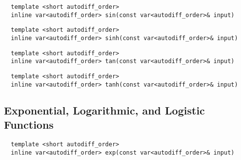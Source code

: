 \begin{tcolorbox}[colback=white,colframe=gray90, coltitle=black,boxrule=3pt,
fonttitle=\bfseries,title=Sine]

\begin{verbatim}
  template <short autodiff_order>
  inline var<autodiff_order> sin(const var<autodiff_order>& input)
\end{verbatim}

\end{tcolorbox}

\begin{tcolorbox}[colback=white,colframe=gray90, coltitle=black,boxrule=3pt,
fonttitle=\bfseries,title=Hyperbolic Sine]

\begin{verbatim}
  template <short autodiff_order>
  inline var<autodiff_order> sinh(const var<autodiff_order>& input)
\end{verbatim}

\end{tcolorbox}

\begin{tcolorbox}[colback=white,colframe=gray90, coltitle=black,boxrule=3pt,
fonttitle=\bfseries,title=Tangent]

\begin{verbatim}
  template <short autodiff_order>
  inline var<autodiff_order> tan(const var<autodiff_order>& input)
\end{verbatim}

\end{tcolorbox}

\begin{tcolorbox}[colback=white,colframe=gray90, coltitle=black,boxrule=3pt,
fonttitle=\bfseries,title=Hyperbolic Tangent]

\begin{verbatim}
  template <short autodiff_order>
  inline var<autodiff_order> tanh(const var<autodiff_order>& input)
\end{verbatim}

\end{tcolorbox}

\subsection{Exponential, Logarithmic, and Logistic Functions}

\begin{tcolorbox}[colback=white,colframe=gray90, coltitle=black,boxrule=3pt,
fonttitle=\bfseries,title=Natural Exponential]

\begin{verbatim}
  template <short autodiff_order>
  inline var<autodiff_order> exp(const var<autodiff_order>& input)
\end{verbatim}

\end{tcolorbox}

